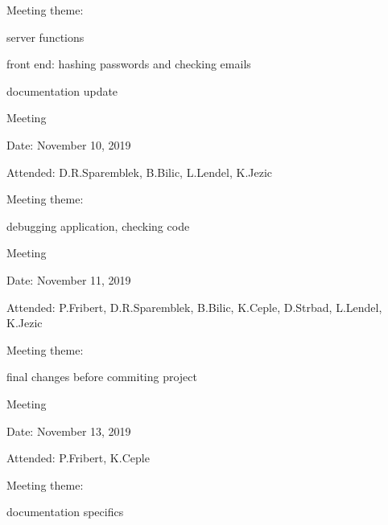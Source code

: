 \begin{packed_enum}
\begin{packed_item}
				\item Meeting theme:
				\begin{packed_item}
					\item  server functions
					\item  front end: hashing passwords and checking emails
					\item  documentation update
				\end{packed_item}
			\end{packed_item}
			\item  Meeting
			\item[] \begin{packed_item}
				\item Date: November 10, 2019
				\item Attended: D.R.Sparemblek, B.Bilic, L.Lendel, K.Jezic
				\item Meeting theme:
				\begin{packed_item}
					\item  debugging application, checking code
				\end{packed_item}
			\end{packed_item}
			\item  Meeting
			\item[] \begin{packed_item}
				\item Date: November 11, 2019
				\item Attended: P.Fribert, D.R.Sparemblek, B.Bilic, K.Ceple, D.Strbad, L.Lendel, K.Jezic
				\item Meeting theme:
				\begin{packed_item}
					\item  final changes before commiting project
				\end{packed_item}
			\end{packed_item}
			
			\item  Meeting
			\item[] \begin{packed_item}
				\item Date: November 13, 2019
				\item Attended: P.Fribert, K.Ceple
				\item Meeting theme:
				\begin{packed_item}
					\item  documentation specifics
				\end{packed_item}
			\end{packed_item}
			

\end{packed_enum}
